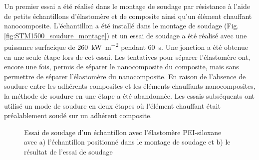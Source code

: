 Un premier essai a été réalisé dans le montage de soudage par résistance à l'aide de petits échantillons d'élastomère et de composite ainsi qu'un élément chauffant nanocomposite. 
L'échantillon a été installé dans le montage de soudage (Fig. \ref{fig:STM1500_soudure_montage}) et un essai de soudage a été réalisé avec une puissance surfacique de \SI[locale=FR]{260}{\kilo\watt\per\square\metre} pendant \SI[locale=FR]{60}{\second}. 
Une jonction a été obtenue en une seule étape lors de cet essai. 
Les tentatives pour séparer l'élastomère ont, encore une fois, permis de séparer le nanocomposite du composite, mais sans permettre de séparer l'élastomère du nanocomposite. 
En raison de l'absence de soudure entre les adhérents composites et les éléments chauffants nanocomposites, la méthode de soudure en une étape a été abandonnée.
Les essais subséquents ont utilisé un mode de soudure en deux étapes où l'élément chauffant était préalablement soudé sur un adhérent composite. 

\FloatBarrier
\begin{figure}[h]
	\centering
	 \qquad
	\caption{Essai de soudage d'un échantillon avec l'élastomère PEI-siloxane avec a) l'échantillon positionné dans le montage de soudage et b) le résultat de l'essai de soudage}
	\label{fig:STM1500_soudure}
\end{figure}
\FloatBarrier

